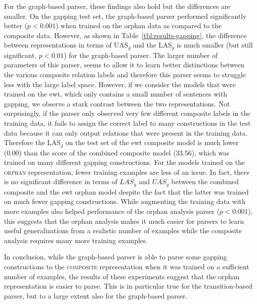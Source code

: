 \documentclass[lucida,biblatex]{sp} %
\begin{document}
For the graph-based parser, these findings also hold but the differences are smaller. On the {\sc gapping} test set, the graph-based parser performed significantly better ($p<0.001$) when trained on the {\sc orphan} data as compared to the {\sc composite} data. However, as shown in Table~\ref{tbl:results-gapping}, the difference between representations in terms of UAS$_g$ and the LAS$_g$ is much smaller (but still significant, $p<0.01$) for the graph-based parser.
The larger number of parameters of this parser, seems  to allow it to learn better distinctions between the various composite relation labels and therefore this parser seems to struggle less with the large label space. However, if we consider the models that were trained on the {\sc ewt}, which only contains a small number of sentences with gapping, we observe a stark contrast between the two representations. Not surprisingly, if the parser only observed very few different composite labels in the training data, it fails to assign the correct label to many constructions in the test data because it can only output relations that were present in the training data. Therefore the LAS$_g$ on the test set of the {\sc ewt composite} model is much lower (0.00) than the score of the {\sc combined composite} model (33.56), which was trained on many different gapping constructions. %
For the models trained on the \textsc{orphan} representation, fewer training examples are less of an issue. In fact, there is no significant difference in terms of $LAS_g$ and $UAS_g$ between the  {\sc combined composite} and the {\sc ewt orphan} model despite the fact that the latter was trained on much fewer gapping constructions. While augmenting the training data with more examples also helped performance of the {\sc orphan} analysis parser ($p<0.001$), this suggests that the {\sc orphan} analysis makes it much easier for parsers to learn useful generalizations from a realistic number of examples while the {\sc composite} analysis requires many more training examples.

In conclusion, while the graph-based parser is able to parse some gapping constructions to the \textsc{composite} representation when it was trained on a sufficient number of examples, the results of these experiments suggest that the {\sc orphan} representation is easier to parse. This is in particular true for the transition-based parser, but to a large extent also for the graph-based parser.
\end{document}
